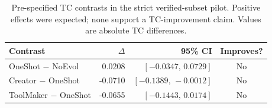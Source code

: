 \begin{table}[t]
\centering
\footnotesize
\caption{Pre-specified TC contrasts in the strict verified-subset pilot. Positive effects were expected; none support a TC-improvement claim. Values are absolute TC differences.}
\label{tab:strict-claims}
\begin{tabular}{lrrc}
\toprule
\textbf{Contrast} & \textbf{$\Delta$} & \textbf{95\% CI} & \textbf{Improves?} \\
\midrule
OneShot $-$ NoEvol & 0.0208 & $[-0.0347,\,0.0729]$ & No \\
Creator $-$ OneShot & -0.0710 & $[-0.1389,\,-0.0012]$ & No \\
ToolMaker $-$ OneShot & -0.0655 & $[-0.1443,\,0.0174]$ & No \\
\bottomrule
\end{tabular}
\end{table}

